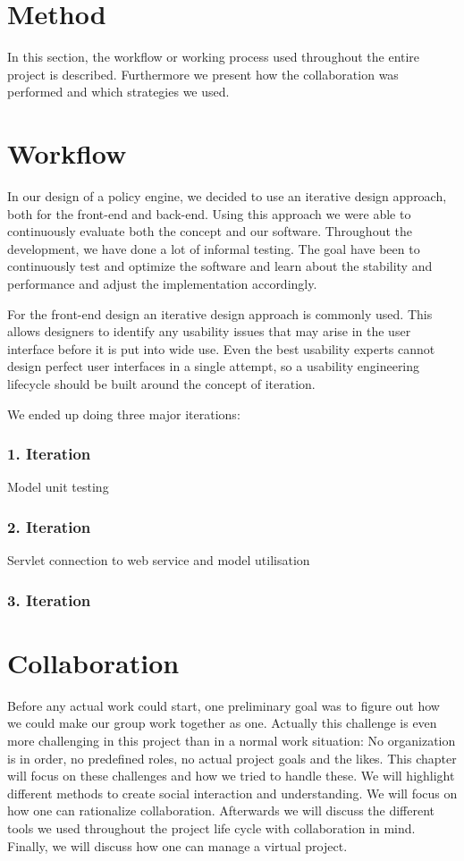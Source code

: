 \section{Method} \label{sec:method}
In this section, the workflow or working process used throughout the entire project is described. Furthermore we present how the collaboration was performed and which strategies we used.

\section{Workflow} \label{sec:workflow}
In our design of a policy engine, we decided to use an iterative design approach, both for the front-end and back-end. Using this approach we were able to continuously evaluate both the concept and our software. Throughout the development, we have done a lot of informal testing. The goal have been to continuously test and optimize the software and learn about the stability and performance and adjust the implementation accordingly. 

For the front-end design an iterative design approach is commonly used. This allows designers to identify any usability issues that may arise in the user interface before it is put into wide use. Even the best usability experts cannot design perfect user interfaces in a single attempt, so a usability engineering lifecycle should be built around the concept of iteration. \cite{Nielsen1993}

We ended up doing three major iterations:

\subsubsection{1. Iteration}
Model unit testing
\subsubsection{2. Iteration}
Servlet connection to web service and model utilisation
\subsubsection{3. Iteration}


\section{Collaboration} \label{sec:collaboration}
Before any actual work could start, one preliminary goal was to figure out how we could make our group work together as one. Actually this challenge is even more challenging in this project than in a normal work situation: No organization is in order, no predefined roles, no actual project goals and the likes. This chapter will focus on these challenges and how we tried to handle these. We will highlight different methods to create social interaction and understanding. We will focus on how one can rationalize collaboration. Afterwards we will discuss the different tools we used throughout the project life cycle with collaboration in mind. Finally, we will discuss how one can manage a virtual project.\\

